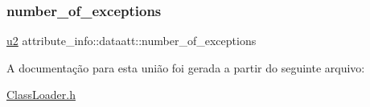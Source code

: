 \mbox{\label{unionattribute__info_1_1dataatt_a6c0783aaa8139388956c2d325ea0e904}} 
\subsubsection{\texorpdfstring{number\+\_\+of\+\_\+exceptions}{number\_of\_exceptions}}
{\footnotesize\ttfamily \hyperlink{ClassLoader_8h_a5f223212eef04d10a4550ded680cb1cf}{u2} attribute\+\_\+info\+::dataatt\+::number\+\_\+of\+\_\+exceptions}



A documentação para esta união foi gerada a partir do seguinte arquivo\+:\begin{DoxyCompactItemize}
\item 
\hyperlink{ClassLoader_8h}{Class\+Loader.\+h}\end{DoxyCompactItemize}
